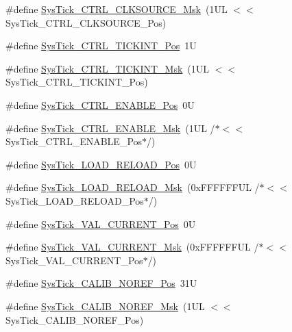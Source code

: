 \begin{DoxyCompactItemize}
\item 
\#define \hyperlink{group___c_m_s_i_s___sys_tick_gaa41d06039797423a46596bd313d57373}{Sys\-Tick\-\_\-\-C\-T\-R\-L\-\_\-\-C\-L\-K\-S\-O\-U\-R\-C\-E\-\_\-\-Msk}~(1\-U\-L $<$$<$ Sys\-Tick\-\_\-\-C\-T\-R\-L\-\_\-\-C\-L\-K\-S\-O\-U\-R\-C\-E\-\_\-\-Pos)
\item 
\#define \hyperlink{group___c_m_s_i_s___sys_tick_ga88f45bbb89ce8df3cd2b2613c7b48214}{Sys\-Tick\-\_\-\-C\-T\-R\-L\-\_\-\-T\-I\-C\-K\-I\-N\-T\-\_\-\-Pos}~1\-U
\item 
\#define \hyperlink{group___c_m_s_i_s___sys_tick_ga95bb984266ca764024836a870238a027}{Sys\-Tick\-\_\-\-C\-T\-R\-L\-\_\-\-T\-I\-C\-K\-I\-N\-T\-\_\-\-Msk}~(1\-U\-L $<$$<$ Sys\-Tick\-\_\-\-C\-T\-R\-L\-\_\-\-T\-I\-C\-K\-I\-N\-T\-\_\-\-Pos)
\item 
\#define \hyperlink{group___c_m_s_i_s___sys_tick_ga0b48cc1e36d92a92e4bf632890314810}{Sys\-Tick\-\_\-\-C\-T\-R\-L\-\_\-\-E\-N\-A\-B\-L\-E\-\_\-\-Pos}~0\-U
\item 
\#define \hyperlink{group___c_m_s_i_s___sys_tick_ga16c9fee0ed0235524bdeb38af328fd1f}{Sys\-Tick\-\_\-\-C\-T\-R\-L\-\_\-\-E\-N\-A\-B\-L\-E\-\_\-\-Msk}~(1\-U\-L /$\ast$$<$$<$ Sys\-Tick\-\_\-\-C\-T\-R\-L\-\_\-\-E\-N\-A\-B\-L\-E\-\_\-\-Pos$\ast$/)
\item 
\#define \hyperlink{group___c_m_s_i_s___sys_tick_gaf44d10df359dc5bf5752b0894ae3bad2}{Sys\-Tick\-\_\-\-L\-O\-A\-D\-\_\-\-R\-E\-L\-O\-A\-D\-\_\-\-Pos}~0\-U
\item 
\#define \hyperlink{group___c_m_s_i_s___sys_tick_ga265912a7962f0e1abd170336e579b1b1}{Sys\-Tick\-\_\-\-L\-O\-A\-D\-\_\-\-R\-E\-L\-O\-A\-D\-\_\-\-Msk}~(0x\-F\-F\-F\-F\-F\-F\-U\-L /$\ast$$<$$<$ Sys\-Tick\-\_\-\-L\-O\-A\-D\-\_\-\-R\-E\-L\-O\-A\-D\-\_\-\-Pos$\ast$/)
\item 
\#define \hyperlink{group___c_m_s_i_s___sys_tick_ga3208104c3b019b5de35ae8c21d5c34dd}{Sys\-Tick\-\_\-\-V\-A\-L\-\_\-\-C\-U\-R\-R\-E\-N\-T\-\_\-\-Pos}~0\-U
\item 
\#define \hyperlink{group___c_m_s_i_s___sys_tick_gafc77b56d568930b49a2474debc75ab45}{Sys\-Tick\-\_\-\-V\-A\-L\-\_\-\-C\-U\-R\-R\-E\-N\-T\-\_\-\-Msk}~(0x\-F\-F\-F\-F\-F\-F\-U\-L /$\ast$$<$$<$ Sys\-Tick\-\_\-\-V\-A\-L\-\_\-\-C\-U\-R\-R\-E\-N\-T\-\_\-\-Pos$\ast$/)
\item 
\#define \hyperlink{group___c_m_s_i_s___sys_tick_ga534dbe414e7a46a6ce4c1eca1fbff409}{Sys\-Tick\-\_\-\-C\-A\-L\-I\-B\-\_\-\-N\-O\-R\-E\-F\-\_\-\-Pos}~31\-U
\item 
\#define \hyperlink{group___c_m_s_i_s___sys_tick_ga3af0d891fdd99bcc8d8912d37830edb6}{Sys\-Tick\-\_\-\-C\-A\-L\-I\-B\-\_\-\-N\-O\-R\-E\-F\-\_\-\-Msk}~(1\-U\-L $<$$<$ Sys\-Tick\-\_\-\-C\-A\-L\-I\-B\-\_\-\-N\-O\-R\-E\-F\-\_\-\-Pos)
$$
\end{DoxyCompactItemize}
